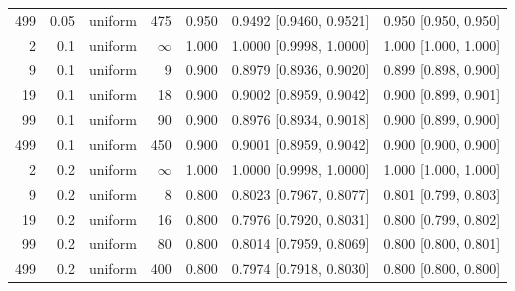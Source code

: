 \begin{longtable}{rrlrrrr}
499 & 0.05 & uniform & 475 & 0.950 & 0.9492 [0.9460, 0.9521] & 0.950 [0.950, 0.950] \\
2 & 0.1 & uniform & $\infty$ & 1.000 & 1.0000 [0.9998, 1.0000] & 1.000 [1.000, 1.000] \\
9 & 0.1 & uniform & 9 & 0.900 & 0.8979 [0.8936, 0.9020] & 0.899 [0.898, 0.900] \\
19 & 0.1 & uniform & 18 & 0.900 & 0.9002 [0.8959, 0.9042] & 0.900 [0.899, 0.901] \\
99 & 0.1 & uniform & 90 & 0.900 & 0.8976 [0.8934, 0.9018] & 0.900 [0.899, 0.900] \\
499 & 0.1 & uniform & 450 & 0.900 & 0.9001 [0.8959, 0.9042] & 0.900 [0.900, 0.900] \\
2 & 0.2 & uniform & $\infty$ & 1.000 & 1.0000 [0.9998, 1.0000] & 1.000 [1.000, 1.000] \\
9 & 0.2 & uniform & 8 & 0.800 & 0.8023 [0.7967, 0.8077] & 0.801 [0.799, 0.803] \\
19 & 0.2 & uniform & 16 & 0.800 & 0.7976 [0.7920, 0.8031] & 0.800 [0.799, 0.802] \\
99 & 0.2 & uniform & 80 & 0.800 & 0.8014 [0.7959, 0.8069] & 0.800 [0.800, 0.801] \\
499 & 0.2 & uniform & 400 & 0.800 & 0.7974 [0.7918, 0.8030] & 0.800 [0.800, 0.800] \\
\bottomrule
\end{longtable}
